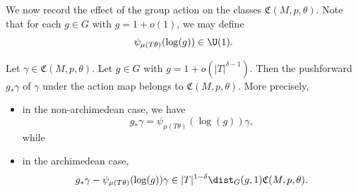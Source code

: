 We now record the effect of the group action on the classes $\mathfrak{C}(M,p,\theta)$.  Note that for each $g \in G$ with $g = 1 + o(1)$, we may define
\begin{equation*}
  \psi_{\mu(T \theta)}(\log(g)) \in \U(1).
\end{equation*}
\begin{proposition}\label{lem:sub-gln:let-gamma-in}
  Let $\gamma \in \mathfrak{C}(M,p,\theta)$.  Let $g \in G$ with $g = 1 + o(|T|^{\delta-1})$.  Then the pushforward $g_* \gamma$ of $\gamma$ under the action map belongs to $\mathfrak{C}(M,p,\theta)$.  More precisely,
  \begin{itemize}
  \item in the non-archimedean case, we have
    \begin{equation}\label{eq:g_-gamma-equivariance-non-arch}
      g_* \gamma = \psi_{\mu(T \theta)} (\log (g)) \gamma,
    \end{equation}
    while
  \item in the archimedean case,
    \begin{equation*}
      g_* \gamma - \psi_{\mu(T \theta)}(\log(g)) \gamma \in |T|^{1 - \delta} \dist_G(g,1) \mathfrak{C}(M,p,\theta).
    \end{equation*}
  \end{itemize}
\end{proposition}

